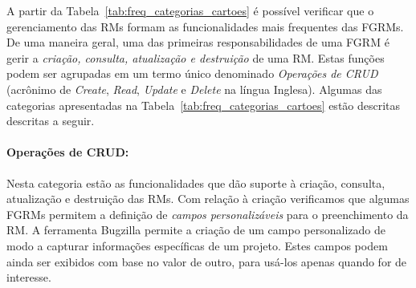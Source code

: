 \begin{table}[htpb]
\centering
{}
\caption{Frequência de cada categoria de funcionalidade no conjunto de cartões
	obtidos.}
\label{tab:freq_categorias_cartoes}
\end{table}

A partir da Tabela~\ref{tab:freq_categorias_cartoes} é possível verificar que o
gerenciamento das RMs formam as funcionalidades mais frequentes das FGRMs\@. De
uma maneira geral, uma das primeiras responsabilidades de uma FGRM é gerir a
\textit{criação, consulta, atualização e destruição} de uma RM\@. Estas funções
podem ser agrupadas em um termo único denominado \textit{Operações de CRUD}
(acrônimo de \textit{Create}, \textit{Read}, \textit{Update} e \textit{Delete}
na língua Inglesa). Algumas das categorias apresentadas na
Tabela~\ref{tab:freq_categorias_cartoes} estão descritas descritas a seguir.

\paragraph{Operações de CRUD:}
\label{par:operações_de_crud}

Nesta categoria estão as funcionalidades que dão suporte à criação,	consulta,
atualização e destruição das RMs. Com relação à criação verificamos que algumas
FGRMs permitem a definição de \textit{campos personalizáveis} para o
preenchimento da RM\@. A ferramenta Bugzilla permite a criação de um campo
personalizado de modo a capturar informações específicas de um projeto. Estes
campos podem ainda ser exibidos com base no valor de outro, para usá-los apenas
quando for de interesse.

